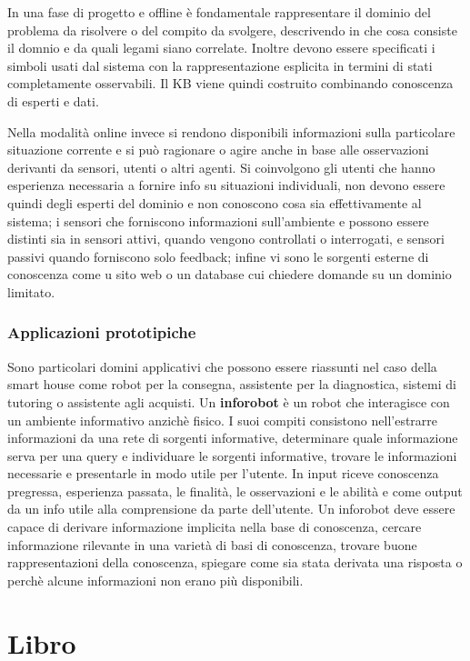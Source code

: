 \documentclass[a4paper]{extarticle}
\begin{document}
In una fase di progetto e offline è fondamentale rappresentare il dominio del problema da risolvere o del compito da svolgere, descrivendo in che cosa consiste il domnio e da quali legami siano correlate. Inoltre devono essere specificati i simboli usati dal sistema con la rappresentazione esplicita in termini di stati completamente osservabili. Il KB viene quindi costruito combinando conoscenza di esperti e dati.

Nella modalità online invece si rendono disponibili informazioni sulla particolare situazione corrente e si può ragionare o agire anche in base alle osservazioni derivanti da sensori, utenti o altri agenti. Si coinvolgono gli utenti che hanno esperienza necessaria a fornire info su situazioni individuali, non devono essere quindi degli esperti del dominio e non conoscono cosa sia effettivamente al sistema; i sensori che forniscono informazioni sull'ambiente e possono essere distinti sia in sensori attivi, quando vengono controllati o interrogati, e sensori passivi quando forniscono solo feedback; infine vi sono le sorgenti esterne di conoscenza come u sito web o un database cui chiedere domande su un dominio limitato.

\subsubsection{Applicazioni prototipiche}

Sono particolari domini applicativi che possono essere riassunti nel caso della smart house come robot per la consegna, assistente per la diagnostica, sistemi di tutoring o assistente agli acquisti. Un \textbf{inforobot} è un robot che interagisce con un ambiente informativo anzichè fisico. I suoi compiti consistono nell'estrarre informazioni da una rete di sorgenti informative, determinare quale informazione serva per una query e individuare le sorgenti informative, trovare le informazioni necessarie e presentarle in modo utile per l'utente. In input riceve conoscenza pregressa, esperienza passata, le finalità, le osservazioni e le abilità e come output da un info utile alla comprensione da parte dell'utente. Un inforobot deve essere capace di derivare informazione implicita nella base di conoscenza, cercare informazione rilevante in una varietà di basi di conoscenza, trovare buone rappresentazioni della conoscenza, spiegare come sia stata derivata una risposta o perchè alcune informazioni non erano più disponibili.
\newpage
\section{Libro}
\end{document}
